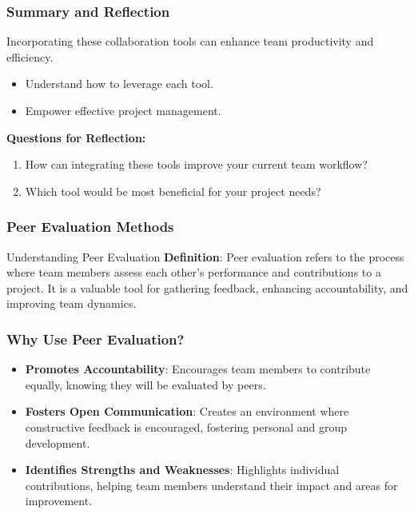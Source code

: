 \documentclass[aspectratio=169]{beamer}
\begin{document}
\begin{frame}[fragile]
    \frametitle{Summary and Reflection}
    Incorporating these collaboration tools can enhance team productivity and efficiency. 
    \begin{itemize}
        \item Understand how to leverage each tool.
        \item Empower effective project management.
    \end{itemize}
    \textbf{Questions for Reflection:}
    \begin{enumerate}
        \item How can integrating these tools improve your current team workflow?
        \item Which tool would be most beneficial for your project needs?
    \end{enumerate}
\end{frame}

\begin{frame}[fragile]
    \frametitle{Peer Evaluation Methods}
    \begin{block}{Understanding Peer Evaluation}
        \textbf{Definition}: Peer evaluation refers to the process where team members assess each other's performance and contributions to a project. It is a valuable tool for gathering feedback, enhancing accountability, and improving team dynamics.
    \end{block}
\end{frame}

\begin{frame}[fragile]
    \frametitle{Why Use Peer Evaluation?}
    \begin{itemize}
        \item \textbf{Promotes Accountability}: Encourages team members to contribute equally, knowing they will be evaluated by peers.
        \item \textbf{Fosters Open Communication}: Creates an environment where constructive feedback is encouraged, fostering personal and group development.
        \item \textbf{Identifies Strengths and Weaknesses}: Highlights individual contributions, helping team members understand their impact and areas for improvement.
    \end{itemize}
\end{frame}
\end{document}
